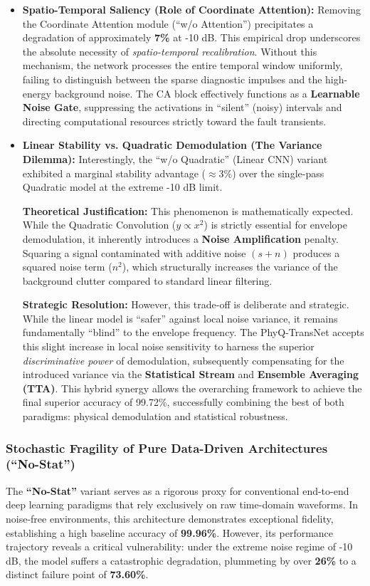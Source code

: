 \documentclass[5p,times,twocolumn]{elsarticle}
\begin{document}
\begin{itemize}
    \item \textbf{Spatio-Temporal Saliency (Role of Coordinate Attention):} 
    Removing the Coordinate Attention module (``w/o Attention'') precipitates a degradation of approximately \textbf{7\%} at -10 dB. This empirical drop underscores the absolute necessity of \textit{spatio-temporal recalibration}. Without this mechanism, the network processes the entire temporal window uniformly, failing to distinguish between the sparse diagnostic impulses and the high-energy background noise. The CA block effectively functions as a \textbf{Learnable Noise Gate}, suppressing the activations in ``silent'' (noisy) intervals and directing computational resources strictly toward the fault transients.

    \item \textbf{Linear Stability vs. Quadratic Demodulation (The Variance Dilemma):} 
    Interestingly, the ``w/o Quadratic'' (Linear CNN) variant exhibited a marginal stability advantage ($\approx 3\%$) over the single-pass Quadratic model at the extreme -10 dB limit.
    
    \textbf{Theoretical Justification:} This phenomenon is mathematically expected. While the Quadratic Convolution ($y \propto x^2$) is strictly essential for envelope demodulation, it inherently introduces a \textbf{Noise Amplification} penalty. Squaring a signal contaminated with additive noise $(s+n)$ produces a squared noise term ($n^2$), which structurally increases the variance of the background clutter compared to standard linear filtering.
    
    \textbf{Strategic Resolution:} However, this trade-off is deliberate and strategic. While the linear model is ``safer'' against local noise variance, it remains fundamentally ``blind'' to the envelope frequency. The PhyQ-TransNet accepts this slight increase in local noise sensitivity to harness the superior \textit{discriminative power} of demodulation, subsequently compensating for the introduced variance via the \textbf{Statistical Stream} and \textbf{Ensemble Averaging (TTA)}. This hybrid synergy allows the overarching framework to achieve the final superior accuracy of 99.72\%, successfully combining the best of both paradigms: physical demodulation and statistical robustness.
\end{itemize}

\subsubsection{Stochastic Fragility of Pure Data-Driven Architectures (``No-Stat'')}
The \textbf{``No-Stat''} variant serves as a rigorous proxy for conventional end-to-end deep learning paradigms that rely exclusively on raw time-domain waveforms. In noise-free environments, this architecture demonstrates exceptional fidelity, establishing a high baseline accuracy of \textbf{99.96\%}. However, its performance trajectory reveals a critical vulnerability: under the extreme noise regime of -10 dB, the model suffers a catastrophic degradation, plummeting by over \textbf{26\%} to a distinct failure point of \textbf{73.60\%}.
\end{document}
